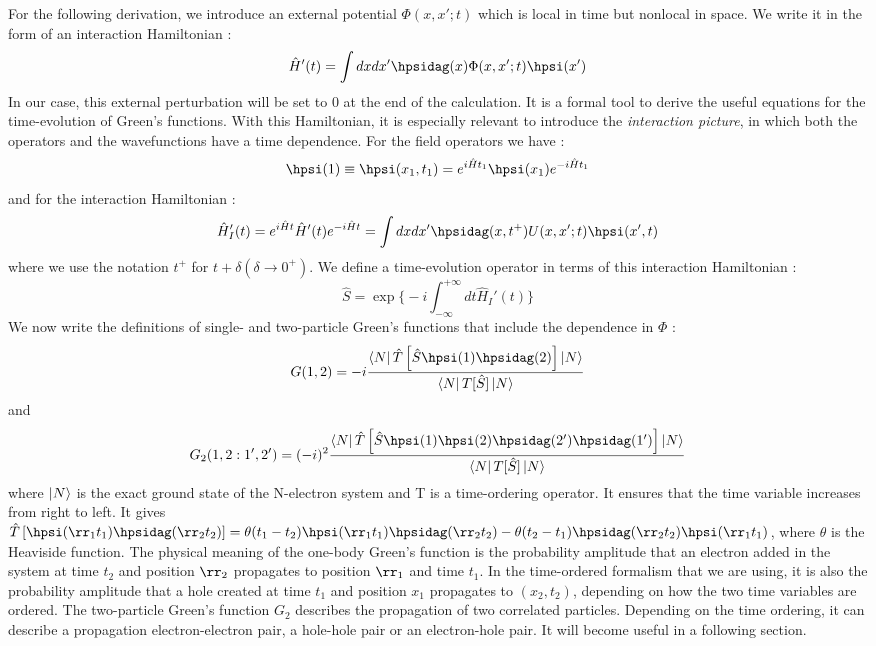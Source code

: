 For the following derivation, we introduce an external potential $\Phi(x,x';t)$ which is local in time but nonlocal in space. We write it in the form of an interaction Hamiltonian :
\begin{equation}
	\hat{H}'(t) = \int dx dx' \hpsidag(x) \Phi(x,x';t) \hpsi(x') 
\end{equation}
In our case, this external perturbation will be set to 0 at the end of the calculation. It is a formal tool to derive the useful equations for the time-evolution of Green's functions. With this Hamiltonian, it is especially relevant to introduce the \textit{interaction picture}, in which both the operators and the wavefunctions have a time dependence.\cite{martin2016interacting} For the field operators we have :
\begin{equation}
	\hpsi(1) \equiv \hpsi(x_1, t_1) = e^{i\hat{H} t_1} \hpsi(x_1) e^{-i\hat{H} t_1}
\end{equation}
and for the interaction Hamiltonian :
\begin{equation}
	\hat{H}_I'(t) = e^{i\hat{H} t} \hat{H}'(t) e^{-i\hat{H} t} = \int dx dx' \hpsidag(x,t^+) U(x,x';t) \hpsi(x',t)
\end{equation}
where we use the notation $t^+$ for $t+\delta (\delta \to 0^+)$. We define a time-evolution operator in terms of this interaction Hamiltonian :
\begin{equation}
	\hat{S} = \exp\biggl\{ -i \int_{-\infty}^{+\infty} dt \hat{H}_I'(t) \biggr\}
\end{equation}
We now write the definitions of single- and two-particle Green's functions that include the dependence in $\Phi$ :
\begin{equation}
	G(1,2) = -i \frac{\bra{N}\hat{T}\left[\hat{S}\hpsi(1)\hpsidag(2)\right]\ket{N}}{\bra{N}T[\hat{S}]\ket{N}} \label{eq:GF}
\end{equation}
and
\begin{equation}
	G_2(1,2:1',2') = (-i)^2  \frac{\bra{N}\hat{T}\left[\hat{S}\hpsi(1)\hpsi(2)\hpsidag(2')\hpsidag(1')\right]\ket{N}}{\bra{N}T[\hat{S}]\ket{N}}\label{eq:2GF}
\end{equation}
where $\ket{N}$ is the exact ground state of the N-electron system and T is a time-ordering operator. It ensures that the time variable increases from right to left. It gives $\hat{T}\left[ \hpsi(\rr_1 t_1) \hpsidag(\rr_2 t_2) \right] = \theta(t_1 - t_2) \hpsi(\rr_1 t_1) \hpsidag(\rr_2 t_2) - \theta(t_2-t_1)\hpsidag(\rr_2 t_2)\hpsi(\rr_1 t_1)$, where $\theta$ is the Heaviside function.\cite{fetter2012quantum} The physical meaning of the one-body Green's function is the probability amplitude that an electron added in the system at time $t_2$ and position $\rr_2$ propagates to position $\rr_1$ and time $t_1$. In the time-ordered formalism that we are using, it is also the probability amplitude that a hole created at time $t_1$ and position $x_1$ propagates to $(x_2,t_2)$, depending on how the two time variables are ordered. 
The two-particle Green's function $G_2$ describes the propagation of two correlated particles. Depending on the time ordering, it can describe a propagation electron-electron pair, a hole-hole pair or an electron-hole pair. It will become useful in a following section.
%

